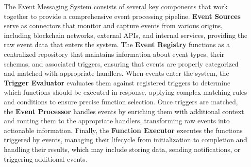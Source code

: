 \documentclass{article}
\begin{document}
The Event Messaging System consists of several key components that work together to provide a comprehensive event processing pipeline. \textbf{Event Sources} serve as connectors that monitor and capture events from various origins, including blockchain networks, external APIs, and internal services, providing the raw event data that enters the system. The \textbf{Event Registry} functions as a centralized repository that maintains information about event types, their schemas, and associated triggers, ensuring that events are properly categorized and matched with appropriate handlers. When events enter the system, the \textbf{Trigger Evaluator} evaluates them against registered triggers to determine which functions should be executed in response, applying complex matching rules and conditions to ensure precise function selection. Once triggers are matched, the \textbf{Event Processor} handles events by enriching them with additional context and routing them to the appropriate handlers, transforming raw events into actionable information. Finally, the \textbf{Function Executor} executes the functions triggered by events, managing their lifecycle from initialization to completion and handling their results, which may include storing data, sending notifications, or triggering additional events.
\end{document}
